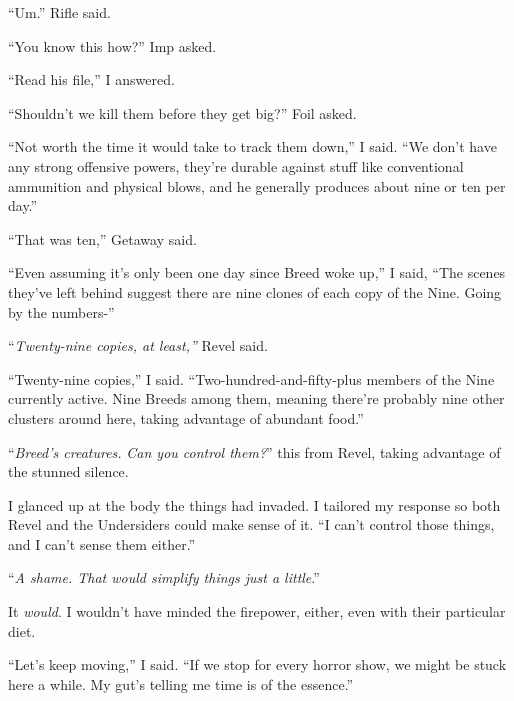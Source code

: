``Um.''  Rifle said.



``You know this how?'' Imp asked.



``Read his file,'' I answered.



``Shouldn't we kill them before they get big?''  Foil asked.



``Not worth the time it would take to track them down,'' I said.  ``We don't have any strong offensive powers, they're durable against stuff like conventional ammunition and physical blows, and he generally produces about nine or ten per day.''



``That was ten,'' Getaway said.



``Even assuming it's only been one day since Breed woke up,'' I said, ``The scenes they've left behind suggest there are nine clones of each copy of the Nine.  Going by the numbers-''



``\emph{Twenty-nine copies, at least,'' }Revel said.



``Twenty-nine copies,'' I said.  ``Two-hundred-and-fifty-plus members of the Nine currently active.  Nine Breeds among them, meaning there're probably nine other clusters around here, taking advantage of abundant food.''



``\emph{Breed's creatures.  }\emph{Can you control them?}'' this from Revel, taking advantage of the stunned silence.



I glanced up at the body the things had invaded.  I tailored my response so both Revel and the Undersiders could make sense of it.  ``I can't control those things, and I can't sense them either.''



``\emph{A shame.  That would simplify things just a little}.''



It \emph{would}.  I wouldn't have minded the firepower, either, even with their particular diet.



``Let's keep moving,'' I said.  ``If we stop for every horror show, we might be stuck here a while.  My gut's telling me time is of the essence.''



